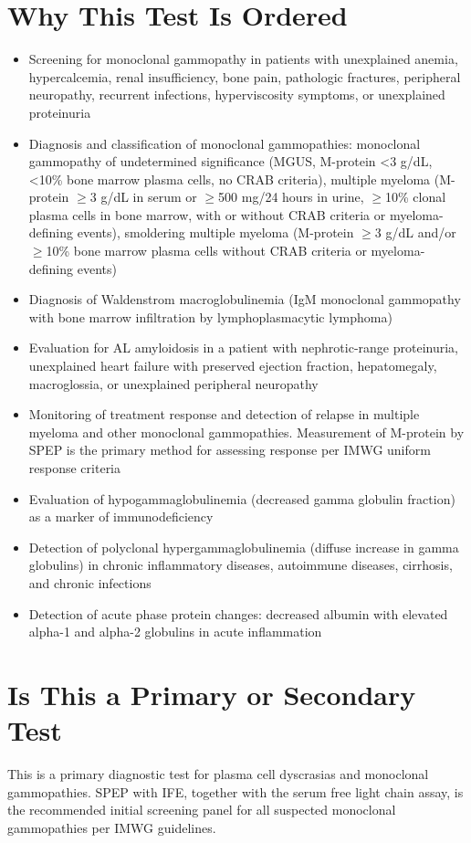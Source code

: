 \section*{Why This Test Is Ordered}
\begin{itemize}
  \item Screening for monoclonal gammopathy in patients with unexplained anemia, hypercalcemia, renal insufficiency, bone pain, pathologic fractures, peripheral neuropathy, recurrent infections, hyperviscosity symptoms, or unexplained proteinuria
  \item Diagnosis and classification of monoclonal gammopathies: monoclonal gammopathy of undetermined significance (MGUS, M-protein <3 g/dL, <10\% bone marrow plasma cells, no CRAB criteria), multiple myeloma (M-protein $\geq$3 g/dL in serum or $\geq$500 mg/24 hours in urine, $\geq$10\% clonal plasma cells in bone marrow, with or without CRAB criteria or myeloma-defining events), smoldering multiple myeloma (M-protein $\geq$3 g/dL and/or $\geq$10\% bone marrow plasma cells without CRAB criteria or myeloma-defining events)
  \item Diagnosis of Waldenstrom macroglobulinemia (IgM monoclonal gammopathy with bone marrow infiltration by lymphoplasmacytic lymphoma)
  \item Evaluation for AL amyloidosis in a patient with nephrotic-range proteinuria, unexplained heart failure with preserved ejection fraction, hepatomegaly, macroglossia, or unexplained peripheral neuropathy
  \item Monitoring of treatment response and detection of relapse in multiple myeloma and other monoclonal gammopathies. Measurement of M-protein by SPEP is the primary method for assessing response per IMWG uniform response criteria
  \item Evaluation of hypogammaglobulinemia (decreased gamma globulin fraction) as a marker of immunodeficiency
  \item Detection of polyclonal hypergammaglobulinemia (diffuse increase in gamma globulins) in chronic inflammatory diseases, autoimmune diseases, cirrhosis, and chronic infections
  \item Detection of acute phase protein changes: decreased albumin with elevated alpha-1 and alpha-2 globulins in acute inflammation
\end{itemize}

\section*{Is This a Primary or Secondary Test}
This is a primary diagnostic test for plasma cell dyscrasias and monoclonal gammopathies. SPEP with IFE, together with the serum free light chain assay, is the recommended initial screening panel for all suspected monoclonal gammopathies per IMWG guidelines.

